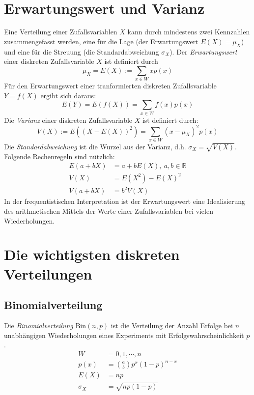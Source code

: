 \section{Erwartungswert und Varianz}
Eine Verteilung einer Zufallsvariablen $X$ kann durch mindestens zwei Kennzahlen zusammengefasst werden, eine für die Lage (der Erwartungswert $E(X)=\mu_X$) und eine für die Streuung (die Standardabweichung $\sigma_X$).
Der \emph{Erwartungswert} einer diskreten Zufallsvariable $X$ ist definiert durch
\begin{equation}
	\label{erwartungswert}
	\mu_X = E(X) := \sum\limits_{x \in W}x p(x)
\end{equation}
Für den Erwartungswert einer tranformierten diskreten Zufallsvariable $Y = f(X)$ ergibt sich daraus:
\begin{equation}
	E(Y) = E(f(X)) = \sum\limits_{x \in W} f(x)p(x)
\end{equation}
Die \emph{Varianz} einer diskreten Zufallsvariable $X$ ist definiert durch:
\begin{equation}
	\label{varianz}
	V(X) := E((X-E(X))^2)=\sum\limits_{x\in W} (x-\mu_X)^2 p(x)
\end{equation}
Die \emph{Standardabweichung} ist die Wurzel aus der Varianz, d.h. $\sigma_X = \sqrt{V(X)}$. \\
Folgende Rechenregeln sind nützlich:
\begin{align}
	E(a+bX) &= a+bE(X), \ a,b \in \mathbb{R}\\
	V(X) &= E(X^2) - E(X)^2\\
	V(a+bX) &= b^2V(X)
\end{align}
In der frequentistischen Interpretation ist der Erwartungswert eine Idealisierung des arithmetischen Mittels der Werte einer Zufallsvariablen bei vielen Wiederholungen.

\section{Die wichtigsten diskreten Verteilungen}
\subsection{Binomialverteilung}
Die \emph{Binomialverteilung} $\mathrm{Bin}(n,p)$ ist die Verteilung der Anzahl Erfolge bei $n$ unabhängigen Wiederholungen eines Experiments mit Erfolgswahrscheinlichkeit $p$.
\begin{align}
	W &= {0,1,\cdots,n}\\
	p(x) &= {a\choose b} p^x(1-p)^{n-x}\\
	E(X) &= np\\
	\sigma_X &= \sqrt{np(1-p)}
\end{align}

